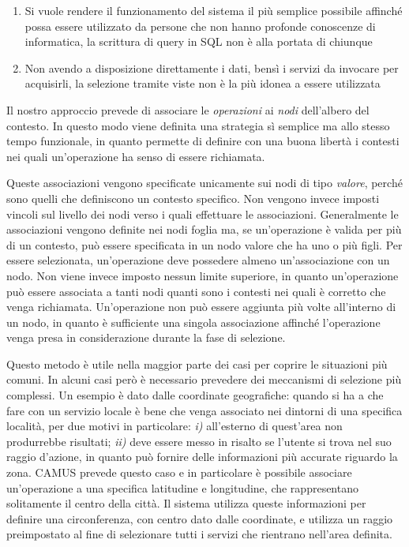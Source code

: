 \begin{enumerate}
	\item
	Si vuole rendere il funzionamento del sistema il più semplice possibile affinché possa essere utilizzato da persone che non hanno profonde conoscenze di informatica, la scrittura di query in SQL non è alla portata di chiunque
	\item
	Non avendo a disposizione direttamente i dati, bensì i servizi da invocare per acquisirli, la selezione tramite viste non è la più idonea a essere utilizzata
\end{enumerate}

Il nostro approccio prevede di associare le \emph{operazioni} ai \emph{nodi} dell'albero del contesto. In questo modo viene definita una strategia sì semplice ma allo stesso tempo funzionale, in quanto permette di definire con una buona libertà i contesti nei quali un'operazione ha senso di essere richiamata.

Queste associazioni vengono specificate unicamente sui nodi di tipo \emph{valore}, perché sono quelli che definiscono un contesto specifico. Non vengono invece imposti vincoli sul livello dei nodi verso i quali effettuare le associazioni. Generalmente le associazioni vengono definite nei nodi foglia ma, se un'operazione è valida per più di un contesto, può essere specificata in un nodo valore che ha uno o più figli. Per essere selezionata, un'operazione deve possedere almeno un'associazione con un nodo. Non viene invece imposto nessun limite superiore, in quanto un'operazione può essere associata a tanti nodi quanti sono i contesti nei quali è corretto che venga richiamata. Un'operazione non può essere aggiunta più volte all'interno di un nodo, in quanto è sufficiente una singola associazione affinché l'operazione venga presa in considerazione durante la fase di selezione.

Questo metodo è utile nella maggior parte dei casi per coprire le situazioni più comuni. In alcuni casi però è necessario prevedere dei meccanismi di selezione più complessi. Un esempio è dato dalle coordinate geografiche: quando si ha a che fare con un servizio locale è bene che venga associato nei dintorni di una specifica località, per due motivi in particolare: \emph{i)} all'esterno di quest'area non produrrebbe risultati; \emph{ii)} deve essere messo in risalto se l'utente si trova nel suo raggio d'azione, in quanto può fornire delle informazioni più accurate riguardo la zona. CAMUS prevede questo caso e in particolare è possibile associare un'operazione a una specifica latitudine e longitudine, che rappresentano solitamente il centro della città. Il sistema utilizza queste informazioni per definire una circonferenza, con centro dato dalle coordinate, e utilizza un raggio preimpostato al fine di selezionare tutti i servizi che rientrano nell'area definita.

